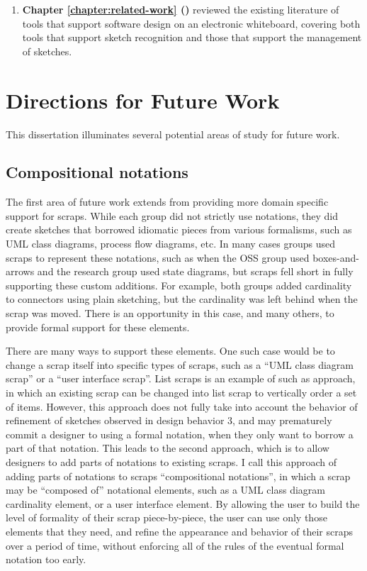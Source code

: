 \begin{enumerate}
   \item \textbf{Chapter \ref{chapter:related-work} ()} reviewed the existing literature of tools that support software design on an electronic whiteboard, covering both tools that support sketch recognition and those that support the management of sketches.
 \end{enumerate}

\section{Directions for Future Work}
This dissertation illuminates several potential areas of study for future work. 

\subsection{Compositional notations}

The first area of future work extends from providing more domain specific support for scraps. While each group did not strictly use notations, they did create sketches that borrowed idiomatic pieces from various formalisms, such as UML class diagrams, process flow diagrams, etc. In many cases groups used scraps to represent these notations, such as when the OSS group used boxes-and-arrows and the research group used state diagrams, but scraps fell short in fully supporting these custom additions. For example, both groups added cardinality to connectors using plain sketching, but the cardinality was left behind when the scrap was moved. There is an opportunity in this case, and many others, to provide formal support for these elements. 

There are many ways to support these elements. One such case would be to change a scrap itself into specific types of scraps, such as a ``UML class diagram scrap'' or a ``user interface scrap''. List scraps is an example of such as approach, in which an existing scrap can be changed into list scrap to vertically order a set of items. However, this approach does not fully take into account the behavior of refinement of sketches observed in design behavior 3, and may prematurely commit a designer to using a formal notation, when they only want to borrow a part of that notation. This leads to the second approach, which is to allow designers to add parts of notations to existing scraps. I call this approach of adding parts of notations to scraps ``compositional notations'', in which a scrap may be ``composed of'' notational elements, such as a UML class diagram cardinality element, or a user interface element. By allowing the user to build the level of formality of their scrap piece-by-piece, the user can use only those elements that they need, and refine the appearance and behavior of their scraps over a period of time, without enforcing all of the rules of the eventual formal notation too early. 


